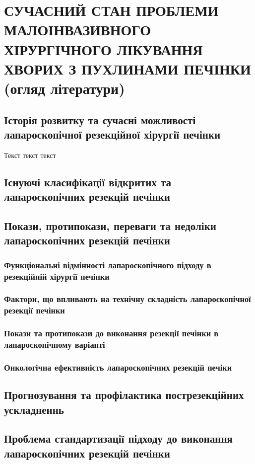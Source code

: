 \chapter {СУЧАСНИЙ СТАН ПРОБЛЕМИ МАЛОІНВАЗИВНОГО ХІРУРГІЧНОГО ЛІКУВАННЯ ХВОРИХ З ПУХЛИНАМИ ПЕЧІНКИ (огляд літератури)}


\section{Історія розвитку та сучасні можливості лапароскопічної резекційної хірургії печінки}
Текст текст текст \cite{Litynski}
\section{Існуючі класифікації відкритих та лапароскопічних резекцій печінки}
\section{Покази, протипокази, переваги та недоліки лапароскопічних резекцій печінки}
    \subsection{Функціональні відмінності лапароскопічного підходу в резекційній хірургії печінки}
    \subsection{Фактори, що впливають на технічну складність лапароскопічної резекції печінки}
    \subsection{Покази та протипокази до виконання резекції печінки в лапароскопічному варіанті}
    \subsection{Онкологічна ефективність лапароскопічних резекцій печіки}
\section{Прогнозування та профілактика пострезекційних ускладненнь}
\section{Проблема стандартизації підходу до виконання лапароскопічних резекцій печінки}


